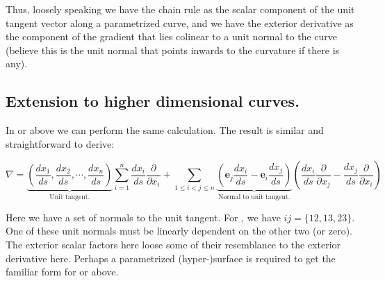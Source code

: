 Thus, loosely speaking we have the chain rule as the scalar component of the unit tangent vector along a parametrized curve,
and we have the exterior derivative as the component of the gradient that lies colinear to a unit normal to the curve (believe this
is the unit normal that points inwards to the curvature if there is any).

\subsection{Extension to higher dimensional curves. }

In  or above we can perform the same calculation.  The result is similar and straightforward to derive:

\begin{equation}
\nabla
=
\underbrace{
\left(\frac{dx_1}{ds}, \frac{dx_2}{ds}, \cdots, \frac{dx_n}{ds}\right)
 }_{\text{Unit tangent.} }
\sum_{i=1}^n \frac{dx_i}{ds}\frac{\partial}{\partial x_i}
+ \sum_{1 \le i < j \le n} 
\underbrace{
\left(
\mathbf{e}_j \frac{dx_i}{ds}
-\mathbf{e}_i \frac{dx_j}{ds}
\right)
}_{\text{ Normal to unit tangent. }}
\left(
\frac{dx_i}{ds}\frac{\partial}{\partial x_j}
-\frac{dx_j}{ds}\frac{\partial}{\partial x_i}
\right)
\end{equation}

Here we have a set of normals to the unit tangent.  For , we have $ij=\{12,13,23\}$.  One of these unit normals must
be linearly dependent on the other two (or zero).  The exterior scalar factors here loose some of their resemblance to the
exterior derivative here.  Perhaps a parametrized (hyper-)surface is required to get the familiar form for  or above.
